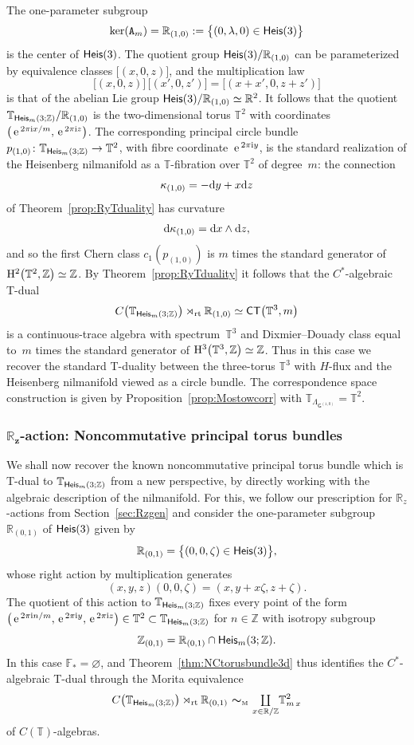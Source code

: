 \documentclass[10pt,a4paper]{amsart}
\numberwithin{equation}{section}
\newcommand{\C}{\complex}
\newcommand{\Z}{\zed}
\newcommand{\F}{\mathbb{F}}
\newcommand{\mbf}[1]{{\boldsymbol {#1} }}
\def\ii{{{\rm i}}}
\def\dd{{\rm d}}
\def\T{{\sf T}}
\def\C{{\sf C}}
\newcommand{\sfG}{\mathsf{G}}
\newcommand{\Heis}{{\sf Heis}}
\newcommand{\rt}{{\rm rt}}
\newcommand{\mcoprod}{\mbox{$\coprod\limits_{x\in\R/\Z}$}}
\newcommand{\R}{\real}
\newcommand{\complex}{{\mathbb C}} %
\newcommand{\zed}{{\mathbb Z}} %
\newcommand{\real}{{\mathbb R}} %
\newcommand{\torus}{{\mathbb T}} %
\def\e{{\,\rm e}\,}
\begin{document}
The one-parameter subgroup
\[
\ker({\tt A}_m) = \real_{(1,0)}:=\big\{(0,\lambda,0) \in \Heis(3) \big\}
\]
is the center of $\Heis(3)$. The quotient group $\Heis(3)/\R_{(1,0)}$ can be parameterized by equivalence
classes $\big[(x,0,z)\big]$, and the
multiplication law
\[
\big[(x,0,z)\big]\,\big[(x',0,z')\big] = \big[(x+x',0,z+z')\big]
\]
is that of the abelian Lie group $\Heis(3)/\R_{(1,0)}\simeq\R^2$. It follows that the quotient
$\torus_{\Heis_m(3;\Z)}/\real_{(1,0)}$ is the two-dimensional torus
$\torus^2$ with coordinates $\big(\e^{2\pi\ii x/m},\e^{2\pi\ii z}\big)$. The corresponding principal circle bundle
$p_{(1,0)}\colon \torus_{\Heis_m(3;\Z)}\to{ \torus^2}$, with fibre coordinate $\e^{2\pi\ii y}$, is the standard realization of
the Heisenberg nilmanifold as a $\torus$-fibration over $\torus^2$ of
degree~$m$: the connection
\[
\kappa_{(1,0)} = -\dd y + x \dd z
\]
of Theorem~\ref{prop:RyTduality} has
curvature
\begin{gather*}
\dd\kappa_{(1,0)} = \dd x\wedge \dd z ,%
\end{gather*}
and so the first Chern class $c_1(p_{(1,0)})$ is $m$ times the standard generator of
${\rm H}^2\big(\torus^2,\Z\big)\simeq\Z$.
By Theorem~\ref{prop:RyTduality} it follows that the $C^*$-algebraic
T-dual
\[
C\big(\torus_{\Heis_m(3;\Z)}\big) \rtimes_\rt \real_{(1,0)} \simeq \C\T\big(\torus^3,m\big)
\]
is a continuous-trace algebra with spectrum~$\torus^3$ and
Dixmier--Douady class equal to~$m$ times the standard generator of ${\rm
 H}^3\big(\torus^3,\Z\big)\simeq\Z$. Thus in this case we recover the
standard T-duality between the three-torus $\torus^3$ with $H$-flux
and the Heisenberg nilmanifold viewed as a circle bundle.
The correspondence space construction is given by
Proposition~\ref{prop:Mostowcorr} with
$\torus_{\Lambda_{\sfG^{(1,0)}}}=\torus^2$.

\subsubsection*{$\boldsymbol{\real_z}$-action: Noncommutative principal torus bundles}\label{sec:nilNCtorus}

We shall now recover the known noncommutative principal torus bundle
which is T-dual to $\torus_{\Heis_m(3;\Z)}$ from a new
perspective, by directly working with the algebraic description of the
nilmanifold. For this, we follow our prescription for $\R_z$-actions
from Section~\ref{sec:Rzgen} and consider the one-parameter subgroup
$\real_{(0,1)}$ of $\Heis(3)$ given by
\[
\real_{(0,1)} = \big\{(0,0,\zeta)\in\Heis(3) \big\} ,
\]
whose right action by multiplication generates
\[
(x,y,z) (0,0,\zeta) = (x,y+x \zeta,z+\zeta) .
\]
The quotient of this action to $\torus_{\Heis_m(3;\Z)}$ fixes
every point of the form $\big(\e^{2\pi\ii n/m},\e^{2\pi\ii
 y},\e^{2\pi\ii z}\big)\in\torus^2\subset \torus_{\Heis_m(3;\Z)}$ for
$n\in\Z$ with isotropy
subgroup
\[
\Z_{(0,1)} = \real_{(0,1)}\cap\Heis_m(3;\Z) .
\]
In this case $\F_*=\varnothing$, and Theorem~\ref{thm:NCtorusbundle3d} thus identifies the $C^*$-algebraic
T-dual through the Morita equivalence{\samepage
\[
C\big(\torus_{\Heis_m(3;\Z)}\big)\rtimes_\rt\real_{(0,1)} \ \mbf\sim_{\text{\tiny M}} \
\mcoprod \torus_{m\,x}^2
\]
of {$C(\torus)$-algebras}.}
\end{document}
